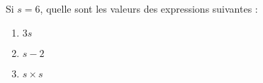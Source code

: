 
\begin{exercice}\label{exo2smath-0074}

    Si \( s=6\), quelle sont les valeurs des expressions suivantes :
    \begin{multicols}{3}
    \begin{enumerate}
        \item
            \( 3s\)
        \item
            \( s-2\)
        \item
            \( s\times s\)
    \end{enumerate}
    \end{multicols}


\end{exercice}
